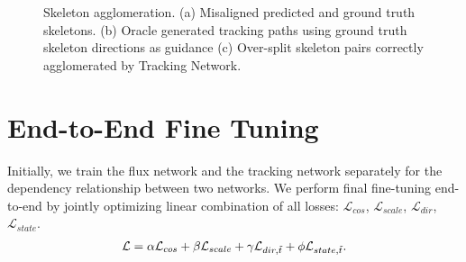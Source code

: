 \begin{figure}[t]
\begin{subfigure}[b]{\hwidth}
		\caption{}
		\label{fig:method_skel_agg_c}
	\end{subfigure}
	\caption{Skeleton agglomeration. (a) Misaligned predicted and ground truth skeletons. (b) Oracle generated tracking paths using ground truth skeleton directions as guidance (c) Over-split skeleton pairs correctly agglomerated by Tracking Network.}
	\label{fig:method_skel_agg}
	\vspace{-0.1in}
\end{figure}

\section{End-to-End Fine Tuning}
Initially, we train the flux network and the tracking network separately for the dependency relationship between two networks. We perform final fine-tuning end-to-end by jointly optimizing linear combination of all losses: $\mathcal{L}_{cos}$, $\mathcal{L}_{scale}$, $\mathcal{L}_{dir}$, $\mathcal{L}_{state}$.  
 \begin{align}
     \mathcal{L}= \alpha\mathcal{L}_{cos} + \beta\mathcal{L}_{scale} + \gamma\mathcal{L}_{dir, \Tilde{t}} + \phi\mathcal{L}_{state, \Tilde{t}}.\label{eqn:totalLoss}
 \end{align}


